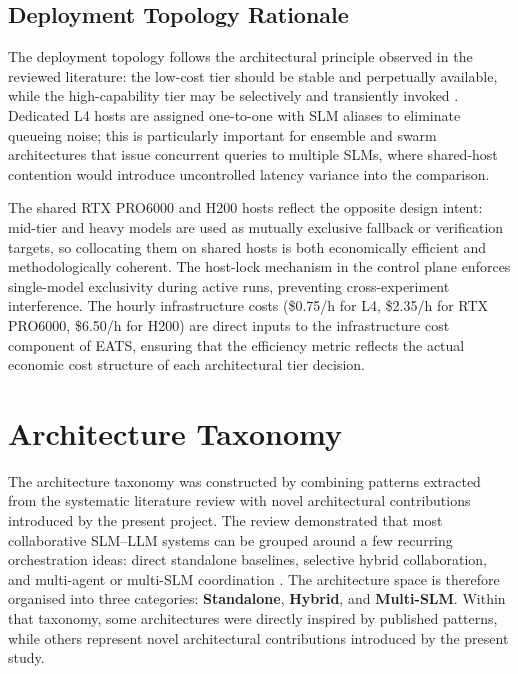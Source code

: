 \subsection{Deployment Topology Rationale}
\label{sec:topology}

The deployment topology follows the architectural principle observed in the reviewed literature: the low-cost tier should be stable and perpetually available, while the high-capability tier may be selectively and transiently invoked \cite{hao2024hybrid, oh2025uncertainty, shao2025dot}. Dedicated L4 hosts are assigned one-to-one with SLM aliases to eliminate queueing noise; this is particularly important for ensemble and swarm architectures that issue concurrent queries to multiple SLMs, where shared-host contention would introduce uncontrolled latency variance into the comparison.

The shared RTX PRO6000 and H200 hosts reflect the opposite design intent: mid-tier and heavy models are used as mutually exclusive fallback or verification targets, so collocating them on shared hosts is both economically efficient and methodologically coherent. The host-lock mechanism in the control plane enforces single-model exclusivity during active runs, preventing cross-experiment interference. The hourly infrastructure costs (\$0.75/h for L4, \$2.35/h for RTX PRO6000, \$6.50/h for H200) are direct inputs to the infrastructure cost component of EATS, ensuring that the efficiency metric reflects the actual economic cost structure of each architectural tier decision.

\section{Architecture Taxonomy}
\label{sec:taxonomy}

The architecture taxonomy was constructed by combining patterns extracted from the systematic literature review with novel architectural contributions introduced by the present project. The review demonstrated that most collaborative SLM--LLM systems can be grouped around a few recurring orchestration ideas: direct standalone baselines, selective hybrid collaboration, and multi-agent or multi-SLM coordination \cite{slrmanuscript2026, hao2024hybrid, shao2025dot, debateagents2025, sentensemble2026}. The architecture space is therefore organised into three categories: \textbf{Standalone}, \textbf{Hybrid}, and \textbf{Multi-SLM}. Within that taxonomy, some architectures were directly inspired by published patterns, while others represent novel architectural contributions introduced by the present study.

